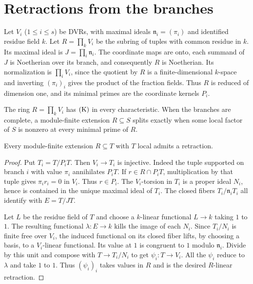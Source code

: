 \section{Retractions from the branches}\label{branches}
Let $V_i$ ($1\le i\le s$) be DVRs, with maximal ideals $\mathfrak n_i=(\pi_i)$ and identified residue field $k$. Let $R=\prod_k V_i$ be the subring of tuples with common residue in $k$. Its maximal ideal is $J=\prod_i\mathfrak n_i$. The coordinate maps are onto, each summand of $J$ is Noetherian over its branch, and consequently $R$ is Noetherian. Its normalization is $\prod_i V_i$, since the quotient by $R$ is a finite-dimensional $k$-space and inverting $(\pi_i)_i$ gives the product of the fraction fields. Thus $R$ is reduced of dimension one, and its minimal primes are the coordinate kernels $P_i$.
\begin{theorem}\label{branch-split}
The ring $R=\prod_k V_i$ has $\mathrm{(K)}$ in every characteristic. When the branches are complete, a module-finite extension $R\subseteq S$ splits exactly when some local factor of $S$ is nonzero at every minimal prime of $R$.
\end{theorem}
\begin{lemma}\label{glue}
Every module-finite extension $R\subseteq T$ with $T$ local admits a retraction.
\end{lemma}
\begin{proof}
Put $T_i=T/P_iT$. Then $V_i\to T_i$ is injective. Indeed the tuple supported on branch $i$ with value $\pi_i$ annihilates $P_iT$. If $r\in R\cap P_iT$, multiplication by that tuple gives $\pi_i r_i=0$ in $V_i$. Thus $r\in P_i$. The $V_i$-torsion in $T_i$ is a proper ideal $N_i$, hence is contained in the unique maximal ideal of $T_i$. The closed fibers $T_i/\mathfrak n_iT_i$ all identify with $E=T/JT$.

Let $L$ be the residue field of $T$ and choose a $k$-linear functional $L\to k$ taking $1$ to $1$. The resulting functional $\lambda:E\to k$ kills the image of each $N_i$. Since $T_i/N_i$ is finite free over $V_i$, the induced functional on its closed fiber lifts, by choosing a basis, to a $V_i$-linear functional. Its value at $1$ is congruent to $1$ modulo $\mathfrak n_i$. Divide by this unit and compose with $T\to T_i/N_i$ to get $\psi_i:T\to V_i$. All the $\psi_i$ reduce to $\lambda$ and take $1$ to $1$. Thus $(\psi_i)_i$ takes values in $R$ and is the desired $R$-linear retraction.
\end{proof}
